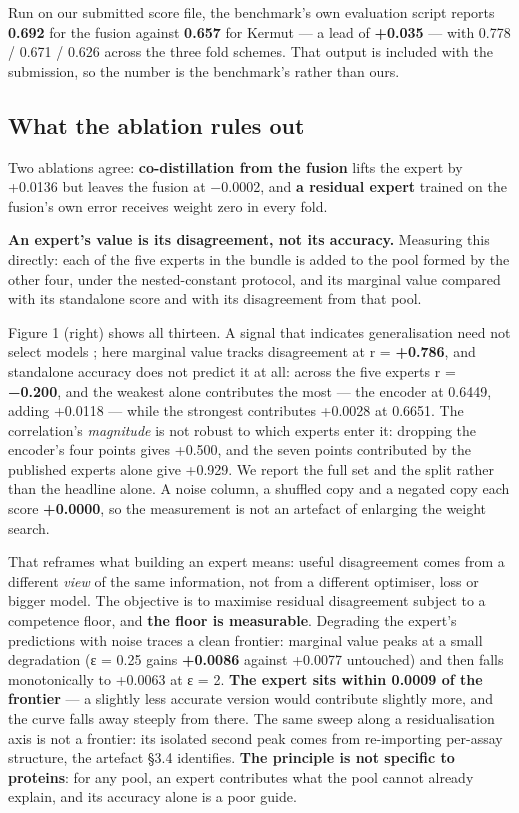 \documentclass{article}
\begin{document}
Run on our submitted score file, the benchmark's own evaluation script reports \textbf{0.692} for the fusion against
\textbf{0.657} for Kermut \cite{kermut} --- a lead of \textbf{+0.035} --- with 0.778 / 0.671 / 0.626 across the three fold schemes.
That output is included with the submission, so the number is the benchmark's rather than ours.

\subsection{What the ablation rules out}\label{what-the-ablation-rules-out}

Two ablations agree: \textbf{co-distillation from the fusion} lifts the expert by +0.0136 but leaves the fusion at
−0.0002, and \textbf{a residual expert} trained on the fusion's own error receives weight zero in every fold.

\textbf{An expert's value is its disagreement, not its accuracy.} Measuring this directly: each of the five experts
in the bundle is added to the pool formed by the other four, under the nested-constant protocol, and its marginal
value compared with its standalone score and with its disagreement from that pool.

Figure 1 (right) shows all thirteen. A signal that indicates generalisation need not select models \cite{nagarsekar2026generalisation}; here
marginal value tracks disagreement at r = \textbf{+0.786}, and standalone accuracy does not predict it at all: across the five experts r = \textbf{−0.200}, and the weakest alone contributes the most --- the
encoder at 0.6449, adding +0.0118 --- while the strongest contributes +0.0028 at 0.6651. The correlation's \emph{magnitude}
is not robust to which experts enter it: dropping the encoder's four points gives +0.500, and the seven points
contributed by the published experts alone give +0.929. We report the full set and the split rather than the headline
alone. A noise column, a shuffled copy and a negated copy each score \textbf{+0.0000}, so the measurement is not an
artefact of enlarging the weight search.

That reframes what building an expert means: useful disagreement comes from a different \emph{view} of the same
information, not from a different optimiser, loss or bigger model. The objective is to maximise residual disagreement subject to a competence floor, and \textbf{the floor is measurable}.
Degrading the expert's predictions with noise traces a clean frontier: marginal value peaks at a small degradation
(ε = 0.25 gains \textbf{+0.0086} against +0.0077 untouched) and then falls monotonically to +0.0063 at ε = 2. \textbf{The
expert sits within 0.0009 of the frontier} --- a slightly less accurate version would contribute slightly more, and
the curve falls away steeply from there. The same sweep along a residualisation axis is not a frontier: its
isolated second peak comes from re-importing per-assay structure, the artefact §3.4 identifies. \textbf{The principle is not specific to proteins}: for any pool, an expert contributes what the pool cannot already
explain, and its accuracy alone is a poor guide.
\end{document}
